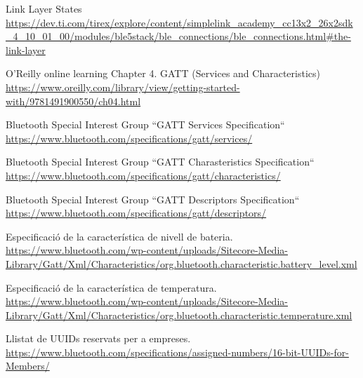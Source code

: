 \begin{thebibliography}{2}
Link Layer States
\href{https://dev.ti.com/tirex/explore/content/simplelink_academy_cc13x2_26x2sdk_4_10_01_00/modules/ble5stack/ble_connections/ble_connections.html\#the-link-layer}{https://dev.ti.com/tirex/explore/content/simplelink\_academy\_cc13x2\_26x2sdk\_4\_10\_01\_00/modules/ble5stack/ble\_connections/ble\_connections.html\#the-link-layer}

O’Reilly online learning
Chapter 4. GATT (Services and Characteristics)
\href{https://www.oreilly.com/library/view/getting-started-with/9781491900550/ch04.html}{https://www.oreilly.com/library/view/getting-started-with/9781491900550/ch04.html}

Bluetooth Special Interest Group
``GATT Services Specification``\newline
\href{https://www.bluetooth.com/specifications/gatt/services/}{https://www.bluetooth.com/specifications/gatt/services/}

Bluetooth Special Interest Group
``GATT Charasteristics Specification``\newline
\href{https://www.bluetooth.com/specifications/gatt/characteristics/}{https://www.bluetooth.com/specifications/gatt/characteristics/}

Bluetooth Special Interest Group
``GATT Descriptors Specification``\newline
\href{https://www.bluetooth.com/specifications/gatt/descriptors/}{https://www.bluetooth.com/specifications/gatt/descriptors/}

Especificació de la característica de nivell de bateria.\newline
\href{https://www.bluetooth.com/wp-content/uploads/Sitecore-Media-Library/Gatt/Xml/Characteristics/org.bluetooth.characteristic.battery\_level.xml}{https://www.bluetooth.com/wp-content/uploads/Sitecore-Media-Library/Gatt/Xml/Characteristics/org.bluetooth.characteristic.battery\_level.xml}

Especificació de la característica de temperatura. \newline
\href{https://www.bluetooth.com/wp-content/uploads/Sitecore-Media-Library/Gatt/Xml/Characteristics/org.bluetooth.characteristic.temperature.xml}{https://www.bluetooth.com/wp-content/uploads/Sitecore-Media-Library/Gatt/Xml/Characteristics/org.bluetooth.characteristic.temperature.xml}

Llistat de UUIDs reservats per a empreses.\newline
\href{https://www.bluetooth.com/specifications/assigned-numbers/16-bit-UUIDs-for-Members/}{https://www.bluetooth.com/specifications/assigned-numbers/16-bit-UUIDs-for-Members/}


\end{thebibliography}
